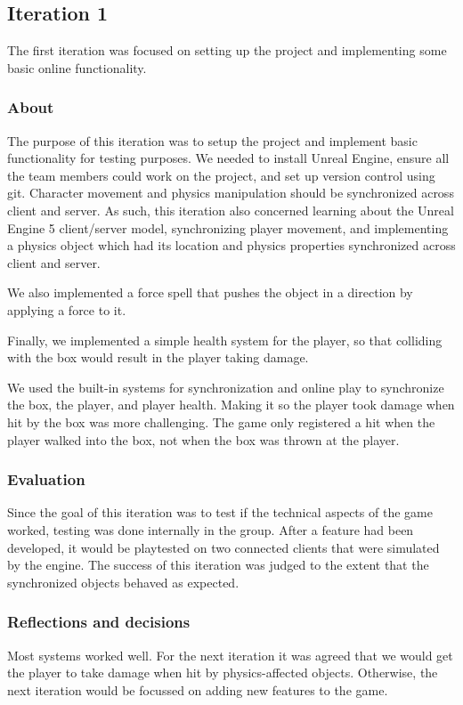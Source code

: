 \documentclass[conference]{IEEEtran}
\begin{document}
   \subsection{Iteration 1}
    The first iteration was focused on setting up the project and implementing some basic online functionality.

    \subsubsection{About}
    The purpose of this iteration was to setup the project and implement basic functionality for testing purposes.
    We needed to install Unreal Engine, ensure all the team members could work on the project, and set up version control using git.
    Character movement and physics manipulation should be synchronized across client and server.
    As such, this iteration also concerned learning about the Unreal Engine 5 client/server model, synchronizing player movement, and implementing a physics object which had its location and physics properties synchronized across client and server.

    We also implemented a force spell that pushes the object in a direction by applying a force to it.

    Finally, we implemented a simple health system for the player, so that colliding with the box would result in the player taking damage.

    We used the built-in systems for synchronization and online play to synchronize the box, the player, and player health.
    Making it so the player took damage when hit by the box was more challenging.
    The game only registered a hit when the player walked into the box, not when the box was thrown at the player.

    \subsubsection{Evaluation}
    Since the goal of this iteration was to test if the technical aspects of the game worked, testing was done internally in the group.
    After a feature had been developed, it would be playtested on two connected clients that were simulated by the engine.
    The success of this iteration was judged to the extent that the synchronized objects behaved as expected.



    \subsubsection{Reflections and decisions}
    Most systems worked well.
    For the next iteration it was agreed that we would get the player to take damage when hit by physics-affected objects.
    Otherwise, the next iteration would be focussed on adding new features to the game.
\end{document}
